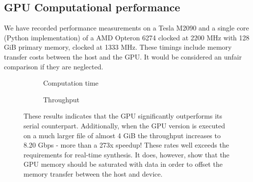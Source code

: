 \documentclass[a4paper,10pt]{article}
\begin{document}
\subsection{GPU Computational performance}
We have recorded performance measurements on a Tesla M2090 and a single core (Python implementation) of a AMD Opteron 6274 clocked at 2200 MHz with 128 GiB primary memory, 
clocked at 1333 MHz. These timings include memory transfer costs between the host and the GPU. It would be considered an unfair comparison if they are neglected.
\begin{figure}[ht!]
 \centering
 \begin{subfigure}{0.45\textwidth}
  \caption{Computation time}
  \end{subfigure}
  
  \begin{subfigure}{0.45\textwidth}
  \caption{Throughput}
  \end{subfigure} 
  \caption[GPU performance]{These results indicates that the GPU significantly outperforms its serial counterpart. Additionally, when the GPU version is executed on a much larger
  file of almost 4 GiB the throughput increases to 8.20 Gbps - more than a 273x speedup! These rates well exceeds the requirements for real-time synthesis. It does, however, 
  show that the GPU memory should be saturated with data in order to offset the memory transfer between the host and device.}
  \label{computation_times}
\end{figure}
\end{document}
